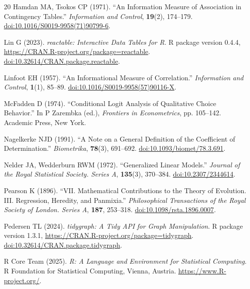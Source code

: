 \documentclass[11pt]{article}
\newcommand{\pkg}[1]{\textsf{#1}}
\newcommand{\proglang}[1]{\textsf{#1}}
\newcommand{\doi}[1]{\href{https://doi.org/#1}{doi:#1}}
\begin{document}
\begin{thebibliography}{20}
Hamdan MA, Tsokos CP (1971).
\newblock ``An Information Measure of Association in Contingency Tables.''
\newblock \emph{Information and Control}, \textbf{19}(2), 174--179.
\newblock \doi{10.1016/S0019-9958(71)90799-6}.

Lin G (2023).
\newblock \emph{\pkg{reactable}: Interactive Data Tables for \proglang{R}}.
\newblock \proglang{R} package version 0.4.4,
\url{https://CRAN.R-project.org/package=reactable}.
\newblock \doi{10.32614/CRAN.package.reactable}.

Linfoot EH (1957).
\newblock ``An Informational Measure of Correlation.''
\newblock \emph{Information and Control}, \textbf{1}(1), 85--89.
\newblock \doi{10.1016/S0019-9958(57)90116-X}.

McFadden D (1974).
\newblock ``Conditional Logit Analysis of Qualitative Choice Behavior.''
\newblock In P Zarembka (ed.), \emph{Frontiers in Econometrics}, pp. 105--142.
Academic Press, New York.

Nagelkerke NJD (1991).
\newblock ``A Note on a General Definition of the Coefficient of Determination.''
\newblock \emph{Biometrika}, \textbf{78}(3), 691--692.
\newblock \doi{10.1093/biomet/78.3.691}.

Nelder JA, Wedderburn RWM (1972).
\newblock ``Generalized Linear Models.''
\newblock \emph{Journal of the Royal Statistical Society. Series A},
\textbf{135}(3), 370--384.
\newblock \doi{10.2307/2344614}.

Pearson K (1896).
\newblock ``VII. Mathematical Contributions to the Theory of Evolution. III.
Regression, Heredity, and Panmixia.''
\newblock \emph{Philosophical Transactions of the Royal Society of London.
Series A}, \textbf{187}, 253--318.
\newblock \doi{10.1098/rsta.1896.0007}.

Pedersen TL (2024).
\newblock \emph{\pkg{tidygraph}: A Tidy API for Graph Manipulation}.
\newblock \proglang{R} package version 1.3.1,
\url{https://CRAN.R-project.org/package=tidygraph}.
\newblock \doi{10.32614/CRAN.package.tidygraph}.

\bibitem[{\proglang{R} Core Team}(2025)]{R}
{\proglang{R} Core Team} (2025).
\newblock \emph{\proglang{R}: A Language and Environment for Statistical Computing}.
\newblock \proglang{R} Foundation for Statistical Computing, Vienna, Austria.
\newblock \url{https://www.R-project.org/}.


\end{thebibliography}
\end{document}
